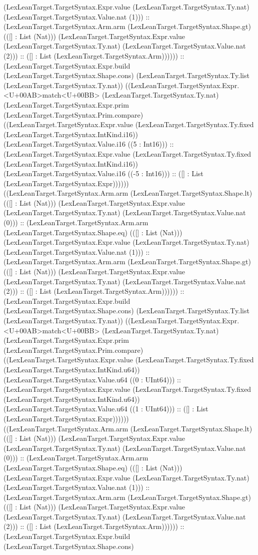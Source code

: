 \documentclass[11pt]{article}
\begin{document}
(LexLeanTarget.TargetSyntax.Expr.value (LexLeanTarget.TargetSyntax.Ty.nat) (LexLeanTarget.TargetSyntax.Value.nat (1))) :: (LexLeanTarget.TargetSyntax.Arm.arm (LexLeanTarget.TargetSyntax.Shape.gt) (([] : List (Nat))) (LexLeanTarget.TargetSyntax.Expr.value (LexLeanTarget.TargetSyntax.Ty.nat) (LexLeanTarget.TargetSyntax.Value.nat (2))) :: ([] : List (LexLeanTarget.TargetSyntax.Arm)))))) :: (LexLeanTarget.TargetSyntax.Expr.build (LexLeanTarget.TargetSyntax.Shape.cons) (LexLeanTarget.TargetSyntax.Ty.list (LexLeanTarget.TargetSyntax.Ty.nat)) ((LexLeanTarget.TargetSyntax.Expr.<U+00AB>match<U+00BB> (LexLeanTarget.TargetSyntax.Ty.nat) (LexLeanTarget.TargetSyntax.Expr.prim (LexLeanTarget.TargetSyntax.Prim.compare) ((LexLeanTarget.TargetSyntax.Expr.value (LexLeanTarget.TargetSyntax.Ty.fixed (LexLeanTarget.TargetSyntax.IntKind.i16)) (LexLeanTarget.TargetSyntax.Value.i16 ((5 : Int16))) :: (LexLeanTarget.TargetSyntax.Expr.value (LexLeanTarget.TargetSyntax.Ty.fixed (LexLeanTarget.TargetSyntax.IntKind.i16)) (LexLeanTarget.TargetSyntax.Value.i16 ((-5 : Int16))) :: ([] : List (LexLeanTarget.TargetSyntax.Expr)))))) ((LexLeanTarget.TargetSyntax.Arm.arm (LexLeanTarget.TargetSyntax.Shape.lt) (([] : List (Nat))) (LexLeanTarget.TargetSyntax.Expr.value (LexLeanTarget.TargetSyntax.Ty.nat) (LexLeanTarget.TargetSyntax.Value.nat (0))) :: (LexLeanTarget.TargetSyntax.Arm.arm (LexLeanTarget.TargetSyntax.Shape.eq) (([] : List (Nat))) (LexLeanTarget.TargetSyntax.Expr.value (LexLeanTarget.TargetSyntax.Ty.nat) (LexLeanTarget.TargetSyntax.Value.nat (1))) :: (LexLeanTarget.TargetSyntax.Arm.arm (LexLeanTarget.TargetSyntax.Shape.gt) (([] : List (Nat))) (LexLeanTarget.TargetSyntax.Expr.value (LexLeanTarget.TargetSyntax.Ty.nat) (LexLeanTarget.TargetSyntax.Value.nat (2))) :: ([] : List (LexLeanTarget.TargetSyntax.Arm)))))) :: (LexLeanTarget.TargetSyntax.Expr.build (LexLeanTarget.TargetSyntax.Shape.cons) (LexLeanTarget.TargetSyntax.Ty.list (LexLeanTarget.TargetSyntax.Ty.nat)) ((LexLeanTarget.TargetSyntax.Expr.<U+00AB>match<U+00BB> (LexLeanTarget.TargetSyntax.Ty.nat) (LexLeanTarget.TargetSyntax.Expr.prim (LexLeanTarget.TargetSyntax.Prim.compare) ((LexLeanTarget.TargetSyntax.Expr.value (LexLeanTarget.TargetSyntax.Ty.fixed (LexLeanTarget.TargetSyntax.IntKind.u64)) (LexLeanTarget.TargetSyntax.Value.u64 ((0 : UInt64))) :: (LexLeanTarget.TargetSyntax.Expr.value (LexLeanTarget.TargetSyntax.Ty.fixed (LexLeanTarget.TargetSyntax.IntKind.u64)) (LexLeanTarget.TargetSyntax.Value.u64 ((1 : UInt64))) :: ([] : List (LexLeanTarget.TargetSyntax.Expr)))))) ((LexLeanTarget.TargetSyntax.Arm.arm (LexLeanTarget.TargetSyntax.Shape.lt) (([] : List (Nat))) (LexLeanTarget.TargetSyntax.Expr.value (LexLeanTarget.TargetSyntax.Ty.nat) (LexLeanTarget.TargetSyntax.Value.nat (0))) :: (LexLeanTarget.TargetSyntax.Arm.arm (LexLeanTarget.TargetSyntax.Shape.eq) (([] : List (Nat))) (LexLeanTarget.TargetSyntax.Expr.value (LexLeanTarget.TargetSyntax.Ty.nat) (LexLeanTarget.TargetSyntax.Value.nat (1))) :: (LexLeanTarget.TargetSyntax.Arm.arm (LexLeanTarget.TargetSyntax.Shape.gt) (([] : List (Nat))) (LexLeanTarget.TargetSyntax.Expr.value (LexLeanTarget.TargetSyntax.Ty.nat) (LexLeanTarget.TargetSyntax.Value.nat (2))) :: ([] : List (LexLeanTarget.TargetSyntax.Arm)))))) :: (LexLeanTarget.TargetSyntax.Expr.build (LexLeanTarget.TargetSyntax.Shape.cons) 
\end{document}
